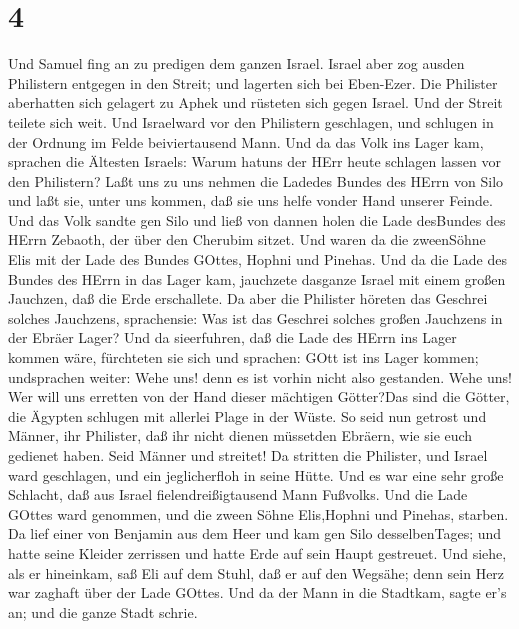 \hypertarget{section-3}{%
\section{4}\label{section-3}}

 Und Samuel fing an zu predigen dem ganzen Israel. Israel
aber zog ausden Philistern entgegen in den Streit; und lagerten sich bei
Eben-Ezer. Die Philister aberhatten sich gelagert zu Aphek 
und rüsteten sich gegen Israel. Und der Streit teilete sich weit. Und
Israelward vor den Philistern geschlagen, und schlugen in der Ordnung im
Felde beiviertausend Mann.  Und da das Volk ins Lager kam,
sprachen die Ältesten Israels: Warum hatuns der HErr heute schlagen
lassen vor den Philistern? Laßt uns zu uns nehmen die Ladedes Bundes des
HErrn von Silo und laßt sie, unter uns kommen, daß sie uns helfe vonder
Hand unserer Feinde.  Und das Volk sandte gen Silo und ließ
von dannen holen die Lade desBundes des HErrn Zebaoth, der über den
Cherubim sitzet. Und waren da die zweenSöhne Elis mit der Lade des
Bundes GOttes, Hophni und Pinehas.  Und da die Lade des
Bundes des HErrn in das Lager kam, jauchzete dasganze Israel mit einem
großen Jauchzen, daß die Erde erschallete.  Da aber die
Philister höreten das Geschrei solches Jauchzens, sprachensie: Was ist
das Geschrei solches großen Jauchzens in der Ebräer Lager? Und da
sieerfuhren, daß die Lade des HErrn ins Lager kommen wäre, 
fürchteten sie sich und sprachen: GOtt ist ins Lager kommen; undsprachen
weiter: Wehe uns! denn es ist vorhin nicht also gestanden. 
Wehe uns! Wer will uns erretten von der Hand dieser mächtigen Götter?Das
sind die Götter, die Ägypten schlugen mit allerlei Plage in der Wüste.
 So seid nun getrost und Männer, ihr Philister, daß ihr
nicht dienen müssetden Ebräern, wie sie euch gedienet haben. Seid Männer
und streitet!  Da stritten die Philister, und Israel ward
geschlagen, und ein jeglicherfloh in seine Hütte. Und es war eine sehr
große Schlacht, daß aus Israel fielendreißigtausend Mann Fußvolks.
 Und die Lade GOttes ward genommen, und die zween Söhne
Elis,Hophni und Pinehas, starben.  Da lief einer von
Benjamin aus dem Heer und kam gen Silo desselbenTages; und hatte seine
Kleider zerrissen und hatte Erde auf sein Haupt gestreuet. 
Und siehe, als er hineinkam, saß Eli auf dem Stuhl, daß er auf den
Wegsähe; denn sein Herz war zaghaft über der Lade GOttes. Und da der
Mann in die Stadtkam, sagte er's an; und die ganze Stadt schrie.
